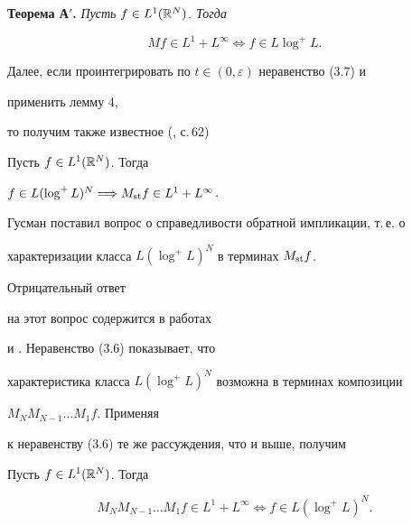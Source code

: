 


{\bf Теорема А$'$.} {\it Пусть $f\in L^1(\Bbb R^N)$. Тогда} 


$$ 


Mf\in L^1+L^\infty \Longleftrightarrow f\in L\log^+L. 


$$ 


\medskip 


 


Далее, если проинтегрировать по $t\in(0,\varepsilon)$ неравенство (3.7) и 


применить лемму 4, 


то получим также известное (\cite{Guz2}, с.\,62) 


 


\begin{assrtnonum} Пусть $f\in L^1(\Bbb R^N)$. Тогда 


$f\in L(\log^+L)^N\Longrightarrow M_{\operatorname{st}} f\in L^1+L^\infty$. 


\end{assrtnonum} 


 


Гусман поставил вопрос о справедливости обратной импликации, т.\,е. о 


характеризации класса $L(\log^+L)^N$ в терминах $M_{\operatorname{st}} f$. 


Отрицательный ответ 


на этот вопрос содержится в работах 


\cite{Gog} и \cite{Bag}. Неравенство (3.6) показывает, что 


характеристика класса $L(\log^+L)^N$ возможна в терминах композиции 


$M_N M_{N-1}\dots M_1 f$. Применяя 


к неравенству (3.6) те же рассуждения, что и выше, получим 


 


\begin{cor} Пусть $f\in L^1(\Bbb R^N)$. Тогда 


$$ 


M_N M_{N-1}\dots M_1 f\in L^1+L^\infty \Longleftrightarrow 


f\in L(\log^+L)^N. 


$$ 


\end{cor} 


